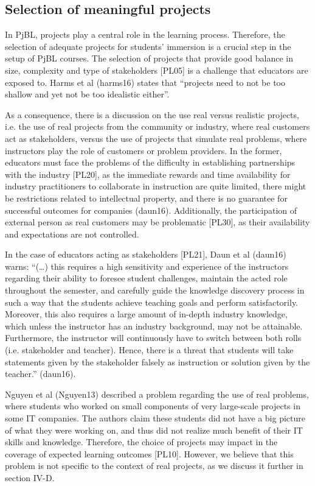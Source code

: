 \subsection{Selection of meaningful projects}

In PjBL, projects play a central role in the learning process. Therefore, the selection of adequate projects for students’ immersion is a crucial step in the setup of PjBL courses. The selection of projects that provide good balance in size, complexity and type of stakeholders [PL05] is a challenge that educators are exposed to. Harms et al (harms16) states that “projects need to not be too shallow and yet not be too idealistic either”.

As a consequence, there is a discussion on the use real versus realistic projects, i.e. the use of real projects from the community or industry, where real customers act as stakeholders, versus the use of projects that simulate real problems, where instructors play the role of customers or problem providers. In the former, educators must face the problems of the difficulty in establishing partnerships with the industry [PL20], as the immediate rewards and time availability for industry practitioners to collaborate in instruction are quite limited, there might be restrictions related to intellectual property, and there is no guarantee for successful outcomes for companies (daun16). Additionally, the participation of external person as real customers may be problematic [PL30], as their availability and expectations are not controlled.

In the case of educators acting as stakeholders [PL21], Daun et al (daun16) warns:
“(…) this requires a high sensitivity and  experience of the instructors regarding their ability to foresee student challenges, maintain the acted role throughout the semester, and carefully guide the knowledge discovery process in such a way that the students achieve teaching goals and perform satisfactorily. Moreover, this also requires a large amount of in-depth industry knowledge, which unless the instructor has an industry background, may not be attainable. Furthermore, the instructor will continuously have to switch between both rolls (i.e. stakeholder and teacher). Hence, there is a threat that students will take statements given by the stakeholder falsely as instruction or solution given by the teacher.” (daun16).

Nguyen et al (Nguyen13) described a problem regarding the use of real problems, where students who worked on small components of very large-scale projects in some IT companies. The authors claim these students did not have a big picture of what they were working on, and thus did not realize much benefit of their IT skills and knowledge. Therefore, the choice of projects may impact in the coverage of expected learning outcomes [PL10]. However, we believe that this problem is not specific to the context of real projects, as we discuss it further in section IV-D.

